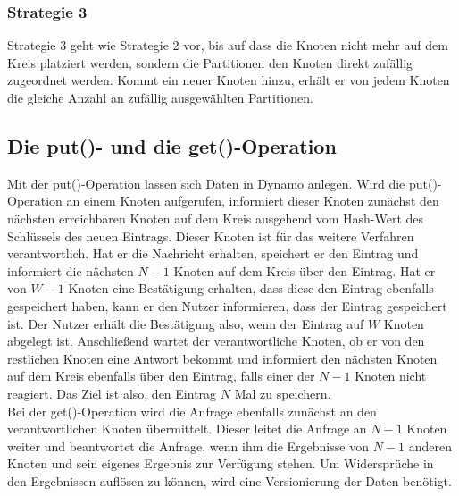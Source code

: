\subsubsection*{Strategie 3}
Strategie 3 geht wie Strategie 2 vor, bis auf dass die Knoten nicht mehr auf dem Kreis platziert werden, sondern die Partitionen den Knoten direkt zufällig zugeordnet werden. Kommt ein neuer Knoten hinzu, erhält er von jedem Knoten die gleiche Anzahl an zufällig ausgewählten Partitionen.
\subsection{Die put()- und die get()-Operation}
Mit der put()-Operation lassen sich Daten in Dynamo anlegen. Wird die put()-Operation an einem Knoten aufgerufen, informiert dieser Knoten zunächst den nächsten erreichbaren Knoten auf dem Kreis ausgehend vom Hash-Wert des Schlüssels des neuen Eintrags. Dieser Knoten ist für das weitere Verfahren verantwortlich. Hat er die Nachricht erhalten, speichert er den Eintrag und informiert die nächsten $N-1$ Knoten auf dem Kreis über den Eintrag. Hat er von $W-1$ Knoten eine Bestätigung erhalten, dass diese den Eintrag ebenfalls gespeichert haben, kann er den Nutzer informieren, dass der Eintrag gespeichert ist. Der Nutzer erhält die Bestätigung also, wenn der Eintrag auf $W$ Knoten abgelegt ist. Anschließend wartet der verantwortliche Knoten, ob er von den restlichen Knoten eine Antwort bekommt und informiert den nächsten Knoten auf dem Kreis ebenfalls über den Eintrag, falls einer der $N-1$ Knoten nicht reagiert. Das Ziel ist also, den Eintrag $N$ Mal zu speichern. \\
Bei der get()-Operation wird die Anfrage ebenfalls zunächst an den verantwortlichen Knoten übermittelt. Dieser leitet die Anfrage an $N-1$ Knoten weiter und beantwortet die Anfrage, wenn ihm die Ergebnisse von $N-1$ anderen Knoten und sein eigenes Ergebnis zur Verfügung stehen. Um Widersprüche in den Ergebnissen auflösen zu können, wird eine Versionierung der Daten benötigt.
